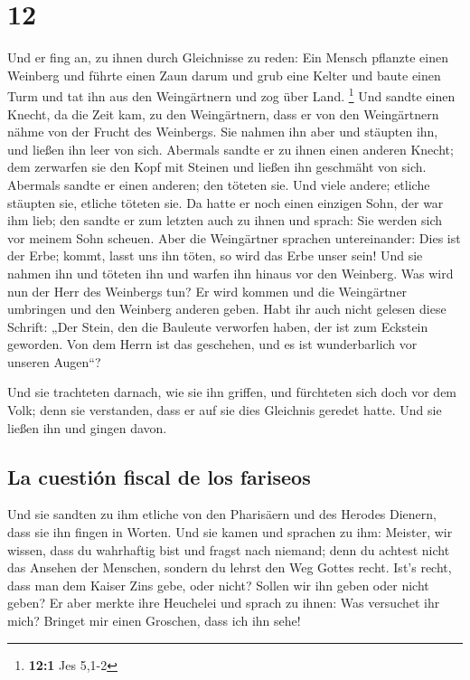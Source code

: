 \hypertarget{section-11}{%
\section{12}\label{section-11}}

 Und er fing an, zu ihnen durch Gleichnisse zu reden: Ein
Mensch pflanzte einen Weinberg und führte einen Zaun darum und grub eine
Kelter und baute einen Turm und tat ihn aus den Weingärtnern und zog
über Land. \footnote{\textbf{12:1} Jes 5,1-2}  Und sandte
einen Knecht, da die Zeit kam, zu den Weingärtnern, dass er von den
Weingärtnern nähme von der Frucht des Weinbergs.  Sie
nahmen ihn aber und stäupten ihn, und ließen ihn leer von sich.
 Abermals sandte er zu ihnen einen anderen Knecht; dem
zerwarfen sie den Kopf mit Steinen und ließen ihn geschmäht von sich.
 Abermals sandte er einen anderen; den töteten sie. Und
viele andere; etliche stäupten sie, etliche töteten sie. 
Da hatte er noch einen einzigen Sohn, der war ihm lieb; den sandte er
zum letzten auch zu ihnen und sprach: Sie werden sich vor meinem Sohn
scheuen.  Aber die Weingärtner sprachen untereinander:
Dies ist der Erbe; kommt, lasst uns ihn töten, so wird das Erbe unser
sein!  Und sie nahmen ihn und töteten ihn und warfen ihn
hinaus vor den Weinberg.  Was wird nun der Herr des
Weinbergs tun? Er wird kommen und die Weingärtner umbringen und den
Weinberg anderen geben.  Habt ihr auch nicht gelesen
diese Schrift: „Der Stein, den die Bauleute verworfen haben, der ist zum
Eckstein geworden.  Von dem Herrn ist das geschehen, und
es ist wunderbarlich vor unseren Augen``?

 Und sie trachteten darnach, wie sie ihn griffen, und
fürchteten sich doch vor dem Volk; denn sie verstanden, dass er auf sie
dies Gleichnis geredet hatte. Und sie ließen ihn und gingen davon.

\hypertarget{la-cuestiuxf3n-fiscal-de-los-fariseos}{%
\subsection{La cuestión fiscal de los
fariseos}\label{la-cuestiuxf3n-fiscal-de-los-fariseos}}

 Und sie sandten zu ihm etliche von den Pharisäern und
des Herodes Dienern, dass sie ihn fingen in Worten.  Und
sie kamen und sprachen zu ihm: Meister, wir wissen, dass du wahrhaftig
bist und fragst nach niemand; denn du achtest nicht das Ansehen der
Menschen, sondern du lehrst den Weg Gottes recht. Ist's recht, dass man
dem Kaiser Zins gebe, oder nicht? Sollen wir ihn geben oder nicht geben?
 Er aber merkte ihre Heuchelei und sprach zu ihnen: Was
versuchet ihr mich? Bringet mir einen Groschen, dass ich ihn sehe!

